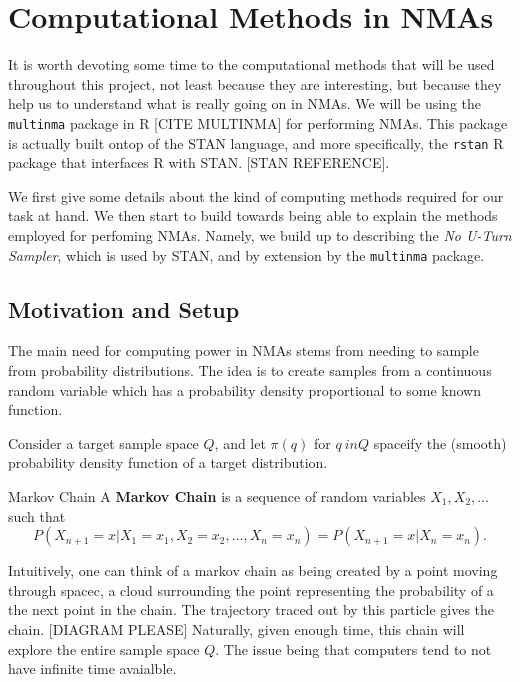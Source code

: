 \chapter{Computational Methods in NMAs}

It is worth devoting some time to the computational methods that will be used throughout this project, not least because they are interesting, but because they help us to understand what is really going on in NMAs.
We will be using the \verb|multinma| package in R [CITE MULTINMA] for performing NMAs. This package is actually built ontop of the STAN language, and more specifically, the \verb|rstan| R package that interfaces R with STAN. [STAN REFERENCE]. 

We first give some details about the kind of computing methods required for our task at hand. We then start to build towards being able to explain the methods employed for perfoming NMAs. Namely, we build up to describing the \textit{No U-Turn Sampler}, which is used by STAN, and by extension by the \verb|multinma| package. 

\section{Motivation and Setup}

The main need for computing power in NMAs stems from needing to sample from probability distributions. The idea is to create samples from a continuous random variable which has a probability density proportional to some known function. 

Consider a target sample space $Q$, and let $\pi(q)$ for $q \ in Q$ spaceify the (smooth) probability density function of a target distribution.



\begin{definition}{Markov Chain}
A \textbf{Markov Chain} is a sequence of random variables $X_1, X_2, \ldots$ such that 
\[
    P(X_{n+1} = x | X_1 = x_1, X_2 = x_2, \ldots, X_n = x_n) = P(X_{n+1} = x | X_n = x_n) 
.\] 
\end{definition}

Intuitively, one can think of a markov chain as being created by a point moving through spacec, a cloud surrounding the point representing the probability of a the next point in the chain. The trajectory traced out by this particle gives the chain. [DIAGRAM PLEASE]
Naturally, given enough time, this chain will explore the entire sample space $Q$. The issue being that computers tend to not have infinite time avaialble.

